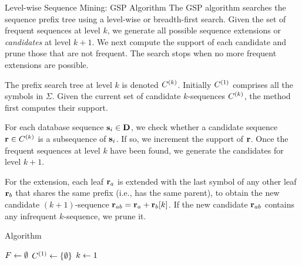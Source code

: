 \begin{frame}{Level-wise Sequence Mining: GSP Algorithm}
\small
  The GSP algorithm searches the sequence pref\/{i}x tree using a
  level-wise or breadth-f\/{i}rst search.  Given the set of frequent
  sequences at level $k$, we generate all possible sequence extensions
  or {\em candidates} at level $k+1$.  We next compute the support of
  each candidate and prune those that are not frequent. The search stops
  when no more frequent extensions are possible.

\medskip
  The pref\/{i}x search tree at level $k$ is
denoted ${\relax C}^{(k)}$. Initially ${\relax C}^{(1)}$ comprises all the symbols in
$\Sigma$. Given the current set of candidate $k$-sequences ${\relax C}^{(k)}$, the
method f\/{i}rst computes their support.

\medskip
For each database sequence $\mathbf{s}_i
\in \mathbf{D}$, we check whether a  candidate sequence $\mathbf{r} \in {\relax C}^{(k)}$
is a subsequence of $\mathbf{s}_i$. If so, we increment the support of $\mathbf{r}$.
Once the frequent sequences at level $k$ have been found, we generate
the candidates for level $k+1$.

\medskip
For the extension, each leaf $\mathbf{r}_a$ is extended with the last symbol of
any other leaf $\mathbf{r}_b$ that shares the same pref\/{i}x (i.e., has the same
parent), to obtain the new candidate $(k+1)$-sequence
$\mathbf{r}_{ab} = \mathbf{r}_a + \mathbf{r}_b[k]$.
If the new candidate $\mathbf{r}_{ab}$ contains any infrequent $k$-sequence, we
prune it.
\end{frame}


\begin{frame}[fragile]{Algorithm \alggsp}
\begin{algorithm}[H]
\AlgorithmA{}
${\relax F} \leftarrow \emptyset$\;
${\relax C}^{(1)} \leftarrow \{\emptyset\}$ 
$k \leftarrow 1$ 
\end{algorithm}
\end{frame}


